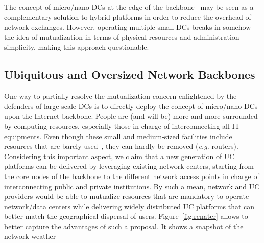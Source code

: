 The concept of micro/nano DCs at the edge of the 
backbone~\cite{greenberg:sigcomm09} may be seen as a complementary solution to
hybrid platforms in order to reduce the overhead of network exchanges.
However, operating multiple small DCs breaks in somehow the idea of
mutualization in terms of physical resources and administration simplicity, making this approach questionable.

\subsection{Ubiquitous and Oversized Network Backbones}
One way to partially resolve the mutualization concern enlightened 
by the defenders of large-scale DCs is to directly deploy the concept of micro/nano DCs upon the Internet backbone.
People are (and will be) more and more
surrounded by computing resources, especially those in charge of
interconnecting all IT equipments. Even though these small and medium-sized
facilities include resources that are barely used~\cite{Andrew:2003,
Benson:2010}, they can hardly be removed (\textit{e.g.} routers).  Considering
this important aspect, we claim that a new generation of UC platforms can be
delivered by leveraging existing network centers, starting from the core nodes of the backbone to the
different network access points in charge of interconnecting public and private
institutions.  By such a mean, network and UC providers would be able to
mutualize resources that are mandatory to operate network/data centers while
delivering widely distributed UC platforms that can better match the
geographical dispersal of users. 
%
%
Figure~\ref{fig:renater} allows to better capture the advantages of such a proposal.
It
 shows a snapshot of the network weather
